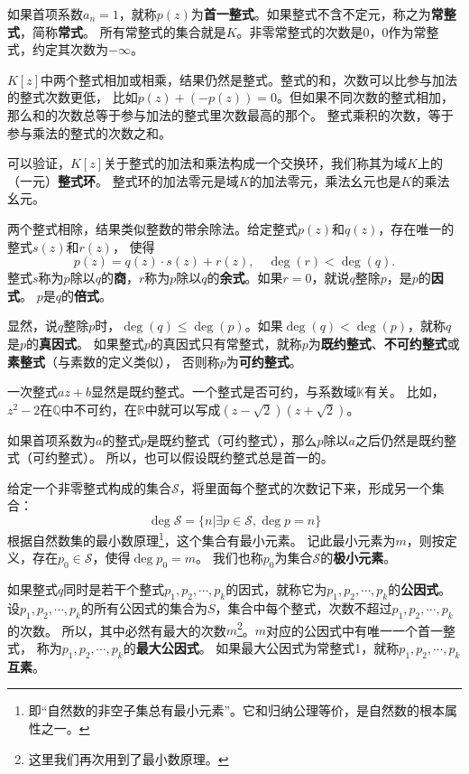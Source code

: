 \documentclass[12pt,UTF8,fontset=none]{ctexbook}
\begin{document}
\begin{appendix}
如果首项系数$a_n = 1$，就称$p(z)$为\textbf{首一整式}。如果整式不含不定元，称之为\textbf{常整式}，简称\textbf{常式}。
所有常整式的集合就是$K$。非零常整式的次数是0，0作为常整式，约定其次数为$-\infty$。

$K[z]$中两个整式相加或相乘，结果仍然是整式。整式的和，次数可以比参与加法的整式次数更低，
比如$p(z) + (-p(z)) = 0$。但如果不同次数的整式相加，那么和的次数总等于参与加法的整式里次数最高的那个。
整式乘积的次数，等于参与乘法的整式的次数之和。

可以验证，$K[z]$关于整式的加法和乘法构成一个交换环，我们称其为域$K$上的（一元）\textbf{整式环}。
整式环的加法零元是域$K$的加法零元，乘法幺元也是$K$的乘法幺元。

两个整式相除，结果类似整数的带余除法。给定整式$p(z)$和$q(z)$，存在唯一的整式$s(z)$和$r(z)$，
使得
$$ p(z) = q(z) \cdot s(z) + r(z),  \quad \deg(r) < \deg(q). $$
整式$s$称为$p$除以$q$的\textbf{商}，$r$称为$p$除以$q$的\textbf{余式}。如果$r = 0$，就说$q$整除$p$，是$p$的\textbf{因式}。
$p$是$q$的\textbf{倍式}。

显然，说$q$整除$p$时，$\deg(q) \leqslant \deg(p)$。如果$\deg(q) < \deg(p)$，就称$q$是$p$的\textbf{真因式}。
如果整式$p$的真因式只有常整式，就称$p$为\textbf{既约整式}、\textbf{不可约整式}或\textbf{素整式}（与素数的定义类似），
否则称$p$为\textbf{可约整式}。

一次整式$az + b$显然是既约整式。一个整式是否可约，与系数域$\mathbb{K}$有关。
比如，$z^2 - 2$在$\mathbb{Q}$中不可约，在$\mathbb{R}$中就可以写成$(z - \sqrt{2})(z + \sqrt{2})$。

如果首项系数为$a$的整式$p$是既约整式（可约整式），那么$p$除以$a$之后仍然是既约整式（可约整式）。
所以，也可以假设既约整式总是首一的。

给定一个非零整式构成的集合$\mathcal{S}$，将里面每个整式的次数记下来，形成另一个集合：
$$\deg \mathcal{S} = \{n | \exists p \in \mathcal{S}, \deg p = n \} $$
根据自然数集的最小数原理\footnote{即“自然数的非空子集总有最小元素”。它和归纳公理等价，是自然数的根本属性之一。}，这个集合有最小元素。
记此最小元素为$m$，则按定义，存在$p_0 \in \mathcal{S}$，使得$\deg p_0 = m$。
我们也称$p_0$为集合$\mathcal{S}$的\textbf{极小元素}。

如果整式$q$同时是若干个整式$p_1, p_2, \cdots , p_k$的因式，就称它为$p_1, p_2, \cdots , p_k$的\textbf{公因式}。
设$p_1, p_2, \cdots , p_k$的所有公因式的集合为$S$，集合中每个整式，次数不超过$p_1, p_2, \cdots , p_k$的次数。
所以，其中必然有最大的次数$m$\footnote{这里我们再次用到了最小数原理。}。$m$对应的公因式中有唯一一个首一整式，
称为$p_1, p_2, \cdots , p_k$的\textbf{最大公因式}。
如果最大公因式为常整式1，就称$p_1, p_2, \cdots , p_k$\textbf{互素}。


\end{appendix}
\end{document}
